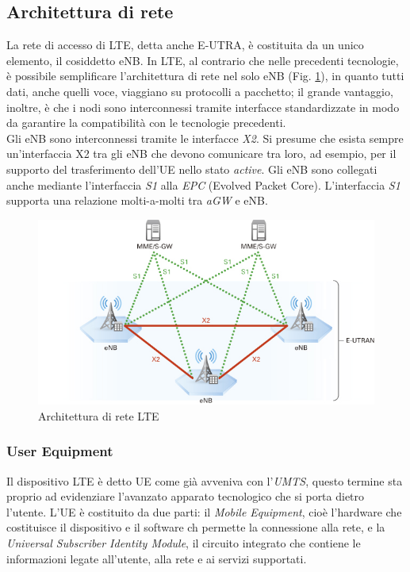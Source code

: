  \subsection{Architettura di rete}
 La rete di accesso di \ac{LTE}, detta anche \ac{E-UTRA}, è costituita da un unico elemento, il cosiddetto \ac{eNB}.
 In \ac{LTE}, al contrario che nelle precedenti tecnologie, è possibile semplificare l'architettura di rete nel solo \ac{eNB} (Fig. \ref{img:enb}),
 in quanto tutti dati, anche quelli voce, viaggiano su protocolli a pacchetto; il grande vantaggio, inoltre, è che i nodi sono 
 interconnessi tramite interfacce standardizzate in modo da garantire la compatibilità con le tecnologie precedenti. \\
 Gli \ac{eNB} sono interconnessi tramite le interfacce \emph{X2}. Si presume che esista sempre un'interfaccia X2 tra gli 
 \ac{eNB} che devono comunicare tra loro, ad esempio, per il supporto del trasferimento dell'\ac{UE} nello stato \emph{active}. 
 Gli \ac{eNB} sono collegati anche mediante l'interfaccia \emph{S1} alla \emph{EPC} (Evolved Packet Core). L'interfaccia \emph{S1} 
 supporta una relazione molti-a-molti tra \emph{aGW} e \ac{eNB}.
 
 \begin{figure}[!h]
 \includegraphics[scale=0.5]{Immagini/enb}
 \centering 
 \caption{Architettura di rete \ac{LTE}}
 \label{img:enb}
 \end{figure}
 
 \subsubsection{User Equipment}
 Il dispositivo \ac{LTE} è detto \ac{UE} come già avveniva con l'\emph{UMTS}, questo termine sta proprio ad evidenziare l'avanzato apparato
 tecnologico che si porta dietro l'utente. L'\ac{UE} è costituito da due parti: il \emph{Mobile Equipment}, cioè l'hardware che costituisce
 il dispositivo e il software ch permette la connessione alla rete, e la \emph{Universal Subscriber Identity Module}, il circuito integrato
 che contiene le informazioni legate all'utente, alla rete e ai servizi supportati.
  
